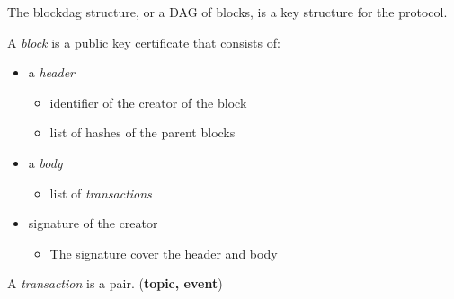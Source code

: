 The blockdag structure, or a DAG of blocks, is a key structure for the
protocol.

A \emph{block} is a public key certificate that consists of:
\begin{itemize}
    \item a \emph{header}
    \begin{itemize}
        \item{identifier of the creator of the block}
        \item{list of hashes of the parent blocks}
    \end{itemize}
    \item a \emph{body}
        \begin{itemize}
            \item{list of \emph{transactions}}
        \end{itemize}
    \item signature of the creator
        \begin{itemize}
            \item{The signature cover the header and body}
        \end{itemize}
\end{itemize}
A \emph{transaction} is a pair. (\textbf{topic, event})

